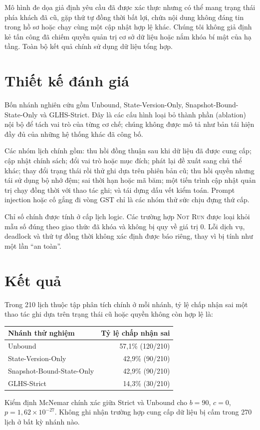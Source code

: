 \documentclass[11pt]{article}
\begin{document}
Mô hình đe dọa giả định yêu cầu đã được xác thực nhưng có thể mang trạng thái phía khách đã cũ, gặp thứ tự đồng thời bất lợi, chứa nội dung không đáng tin trong hồ sơ hoặc chạy cùng một cập nhật hợp lệ khác. Chúng tôi không giả định kẻ tấn công đã chiếm quyền quản trị cơ sở dữ liệu hoặc nắm khóa bí mật của hạ tầng. Toàn bộ kết quả chính sử dụng dữ liệu tổng hợp.

\section{Thiết kế đánh giá}
Bốn nhánh nghiên cứu gồm Unbound, State-Version-Only, Snapshot-Bound-State-Only và GLHS-Strict. Đây là các cấu hình loại bỏ thành phần (ablation) nội bộ để tách vai trò của từng cơ chế; chúng không được mô tả như bản tái hiện đầy đủ của những hệ thống khác đã công bố.

Các nhóm lịch chính gồm: thu hồi đồng thuận sau khi dữ liệu đã được cung cấp; cập nhật chính sách; đổi vai trò hoặc mục đích; phát lại đề xuất sang chủ thể khác; thay đổi trạng thái rồi thử ghi dựa trên phiên bản cũ; thu hồi quyền nhưng tái sử dụng bộ nhớ đệm; sai thời hạn hoặc mã băm; một tiến trình cập nhật quản trị chạy đồng thời với thao tác ghi; và tái dựng dấu vết kiểm toán. Prompt injection hoặc cố gắng đi vòng GST chỉ là các nhóm thử sức chịu đựng thứ cấp.

Chỉ số chính được tính ở cấp lịch logic. Các trường hợp \textsc{Not Run} được loại khỏi mẫu số đúng theo giao thức đã khóa và không bị quy về giá trị 0. Lỗi dịch vụ, deadlock và thứ tự đồng thời không xác định được báo riêng, thay vì bị tính như một lần ``an toàn''.

\section{Kết quả}
Trong 210 lịch thuộc tập phân tích chính ở mỗi nhánh, tỷ lệ chấp nhận sai một thao tác ghi dựa trên trạng thái cũ hoặc quyền không còn hợp lệ là:
\begin{center}
\begin{tabular}{lr}
\toprule
Nhánh thử nghiệm & Tỷ lệ chấp nhận sai\\
\midrule
Unbound & 57,1\% (120/210)\\
State-Version-Only & 42,9\% (90/210)\\
Snapshot-Bound-State-Only & 42,9\% (90/210)\\
GLHS-Strict & 14,3\% (30/210)\\
\bottomrule
\end{tabular}
\end{center}
Kiểm định McNemar chính xác giữa Strict và Unbound cho $b=90$, $c=0$, $p=1{,}62\times10^{-27}$. Không ghi nhận trường hợp cung cấp dữ liệu bị cấm trong 270 lịch ở bất kỳ nhánh nào.
\end{document}
